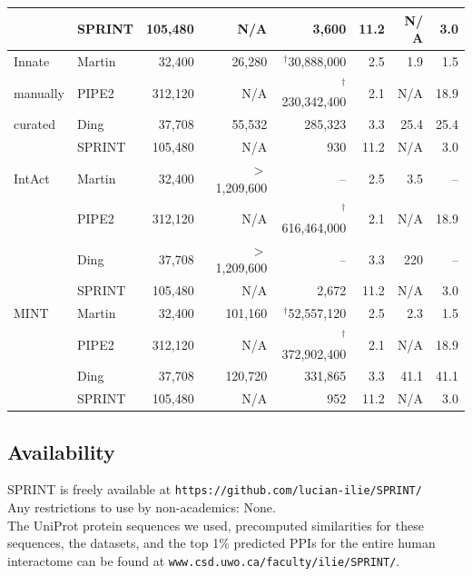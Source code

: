 \begin{table}[!h!]
\begin{tabular}{@{}llrrrrrr@{}}
&	SPRINT & 105,480 & {\scriptsize N$\!$/$\!$A} & 3,600 & 11.2 & {\scriptsize N$\!$/$\!$A} & 3.0  \\ \midrule
Innate  &  %
	Martin & 32,400 & 26,280 & ${}^\dag$30,888,000 & 2.5 & 1.9 & 1.5 \\ 
manually &	PIPE2 & 312,120 & {\scriptsize N$\!$/$\!$A} & ${}^\dag$230,342,400  &  2.1 &  {\scriptsize N$\!$/$\!$A} & 18.9 \\ 
curated &	Ding	   & 37,708 & 55,532 & 285,323 & 3.3 & 25.4 & 25.4 \\
&	SPRINT & 105,480 & {\scriptsize N$\!$/$\!$A} & 930 & 11.2 & {\scriptsize N$\!$/$\!$A} & 3.0  \\ \midrule
IntAct & %
	Martin & 32,400 & $>$ 1,209,600 & {\scriptsize  -- }    & 2.5 & 3.5 & {\scriptsize  -- } \\ 
&	PIPE2 & 312,120 & {\scriptsize N$\!$/$\!$A} & ${}^\dag$616,464,000 &  2.1 &  {\scriptsize N$\!$/$\!$A} & 18.9\\ 
&	Ding	   & 37,708 &  $>$ 1,209,600 & {\scriptsize  -- }   & 3.3 & 220 & {\scriptsize  -- } \\
&	SPRINT & 105,480 & {\scriptsize N$\!$/$\!$A} & 2,672 & 11.2 & {\scriptsize N$\!$/$\!$A} & 3.0  \\ \midrule
MINT & %
	Martin & 32,400 & 101,160  & ${}^\dag$52,557,120 & 2.5 & 2.3 & 1.5\\ 
&	PIPE2 & 312,120 & {\scriptsize N$\!$/$\!$A} & ${}^\dag$372,902,400 &  2.1 &  {\scriptsize N$\!$/$\!$A} & 18.9 \\ 
&	Ding	   & 37,708 & 120,720 & 331,865 & 3.3 & 41.1 & 41.1\\
&	SPRINT & 105,480 & {\scriptsize N$\!$/$\!$A} & 952 & 11.2 & {\scriptsize N$\!$/$\!$A} & 3.0  \\ \bottomrule
\end{tabular}
\end{table}

\subsection{Availability}
SPRINT is freely available at  \texttt{https://github.com/lucian-ilie/SPRINT/}\\
Any restrictions to use by non-academics: None.\\
The UniProt protein sequences we used, precomputed similarities for these sequences, the datasets, and the top 1\% predicted PPIs for the entire human interactome can be found at \texttt{www.csd.uwo.ca/faculty/ilie/SPRINT/}.\\

